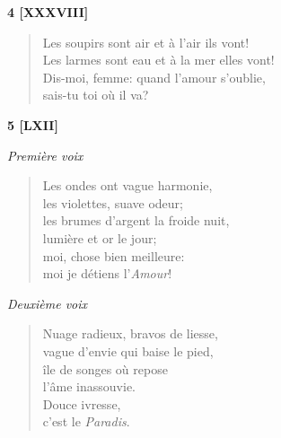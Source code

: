 \documentclass[a4paper,12pt]{book}
\begin{document}
\bigskip

\begin{center} \textbf{4 [XXXVIII]}  \end{center}

\begin{verse}
Les soupirs sont air et à l'air ils vont! \\
Les larmes sont eau et à la mer elles vont! \\
Dis-moi, femme: quand l'amour s'oublie, \\
sais-tu toi où il va? \\
\end{verse}

\bigskip

\begin{center} {\bf 5 [LXII]} \end{center}

\smallskip

\begin{center} {\em Première voix} \end{center}

\begin{verse}
Les ondes ont vague harmonie, \\
les violettes, suave odeur; \\
les brumes d'argent la froide nuit, \\
lumière et or le jour; \\
moi, chose bien meilleure: \\
moi je détiens l'{\em Amour\/}!
\end{verse}

\smallskip

\begin{center} {\em Deuxième voix} \end{center}

\begin{verse}
Nuage radieux, bravos de liesse, \\
vague d'envie qui baise le pied, \\
île de songes où repose \\
l'âme inassouvie. \\
Douce ivresse, \\
c'est le {\em Paradis}.
\end{verse}

\end{document}
